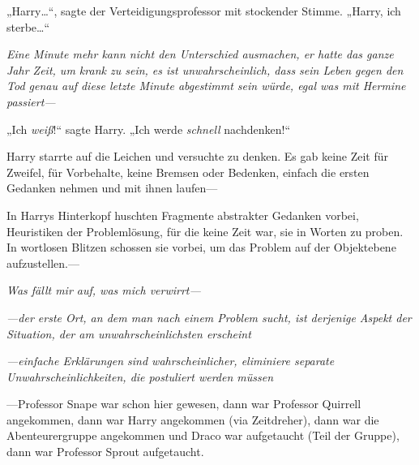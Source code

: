 „Harry…“, sagte der Verteidigungsprofessor mit stockender Stimme. „Harry, ich sterbe…“

\emph{Eine Minute mehr kann nicht den Unterschied ausmachen, er hatte das \emph{ganze Jahr} Zeit, um krank zu sein, es ist \emph{unwahrscheinlich}, dass sein Leben gegen den Tod genau auf diese letzte Minute abgestimmt sein würde, egal was mit Hermine passiert—}

„Ich \emph{weiß}!“ sagte Harry. „Ich werde \emph{schnell} nachdenken!“

Harry starrte auf die Leichen und versuchte zu denken. Es gab keine Zeit für Zweifel, für Vorbehalte, keine Bremsen oder Bedenken, einfach die ersten Gedanken nehmen und mit ihnen laufen—

In Harrys Hinterkopf huschten Fragmente abstrakter Gedanken vorbei, Heuristiken der Problemlösung, für die keine Zeit war, sie in Worten zu proben. In wortlosen Blitzen schossen sie vorbei, um das Problem auf der Objektebene aufzustellen.—

\emph{Was fällt mir auf, was mich verwirrt—}

\emph{—der erste Ort, an dem man nach einem Problem sucht, ist derjenige Aspekt der Situation, der am unwahrscheinlichsten erscheint}

\emph{—einfache Erklärungen sind wahrscheinlicher, eliminiere separate Unwahrscheinlichkeiten, die postuliert werden müssen}

—Professor Snape war schon hier gewesen, dann war Professor Quirrell angekommen, dann war Harry angekommen (via Zeitdreher), dann war die Abenteurergruppe angekommen und Draco war aufgetaucht (Teil der Gruppe), dann war Professor Sprout aufgetaucht.

